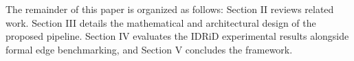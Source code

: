 The remainder of this paper is organized as follows: Section II reviews related work. Section III details the mathematical and architectural design of the proposed pipeline. Section IV evaluates the IDRiD experimental results alongside formal edge benchmarking, and Section V concludes the framework.
